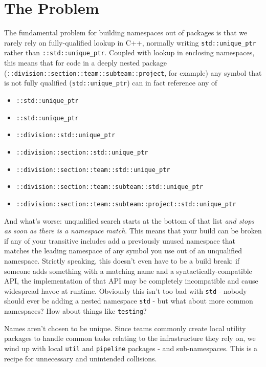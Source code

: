 \section{The Problem}
The fundamental problem for building namespaces out of packages is that we rarely rely on fully-qualified lookup in C++, normally writing \texttt{std::unique_ptr} rather than \texttt{::std::unique_ptr}. Coupled with lookup in enclosing namespaces, this means that for code in a deeply nested package (\texttt{::division::section::team::subteam::project}, for example) any symbol that is not fully qualified (\texttt{std::unique_ptr}) can in fact reference any of
\begin{itemize}
  \item \texttt{::std::unique_ptr}
  \item \texttt{::std::unique_ptr}
  \item \texttt{::division::std::unique_ptr}
  \item \texttt{::division::section::std::unique_ptr}
  \item \texttt{::division::section::team::std::unique_ptr}
  \item \texttt{::division::section::team::subteam::std::unique_ptr}
  \item \texttt{::division::section::team::subteam::project::std::unique_ptr}
\end{itemize}

And what’s worse: unqualified search starts at the bottom of that list \emph{and stops as soon as there is a namespace match}. This means that your build can be broken if any of your transitive includes add a previously unused namespace that matches the leading namespace of any symbol you use out of an unqualified namespace. Strictly speaking, this doesn’t even have to be a build break: if someone adds something with a matching name and a syntactically-compatible API, the implementation of that API may be completely incompatible and cause widespread havoc at runtime. Obviously this isn’t too bad with \texttt{std} - nobody should ever be adding a nested namespace \texttt{std} - but what about more common namespaces? How about things like \texttt{testing}?

Names aren’t chosen to be unique. Since teams commonly create local utility packages to handle common tasks relating to the infrastructure they rely on, we wind up with local \texttt{util} and \texttt{pipeline} packages - and sub-namespaces. This is a recipe for unnecessary and unintended collisions.

